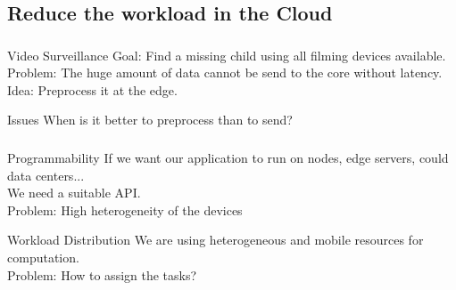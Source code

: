 \documentclass[utf8,xcolor=table, page number]{earlywinter}
\begin{document}
\subsection{Reduce the workload in the Cloud}
\begin{frame}
  \frametitle{\secname}
  \framesubtitle{\subsecname}

  \begin{exampleblock}{Video Surveillance}
    Goal: Find a missing child using all filming devices available.\\
    Problem: The huge amount of data cannot be send to the core without latency.\\
    Idea: Preprocess it at the edge.
  \end{exampleblock}
  \vfill
  \begin{alertblock}{Issues}
    When is it better to preprocess than to send?
  \end{alertblock}

\end{frame}

\begin{frame}
  \frametitle{\secname}
  \framesubtitle{\subsecname}
  \begin{alertblock}{Programmability}
    If we want our application to run on nodes, edge servers, could data centers...\\
    We need a suitable API.\\
    Problem: High heterogeneity of the devices
  \end{alertblock}
  \vfill
  \begin{alertblock}{Workload Distribution}
    We are using heterogeneous and mobile resources for computation.\\
    Problem: How to assign the tasks?
  \end{alertblock}
  
\end{frame}
\end{document}
